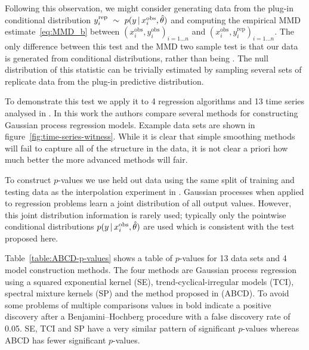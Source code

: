 \documentclass{article} %
\begin{document}
Following this observation, we might consider generating data from the plug-in conditional distribution ${y_i^\textrm{rep} \ \sim\  p(y\,|\, x_i^\textrm{obs}, \hat\theta)}$ and computing the empirical MMD estimate~\eqref{eq:MMD_b} between ${(x_i^\textrm{obs}, y_i^\textrm{obs})_{i=1\ldots n}}$ and ${(x_i^\textrm{obs}, y_i^\textrm{rep})_{i=1\ldots n}}$.
The only difference between this test and the MMD two sample test is that our data is generated from conditional distributions, rather than being \iid.
The null distribution of this statistic can be trivially estimated by sampling several sets of replicate data from the plug-in predictive distribution.

To demonstrate this test we apply it to 4 regression algorithms and 13 time series analysed in \cite{Lloyd2014-ABCD}.
In this work the authors compare several methods for constructing Gaussian process regression models.
Example data sets are shown in figure~\ref{fig:time-series-witness}.
While it is clear that simple smoothing methods will fail to capture all of the structure in the data, it is not clear a priori how much better the more advanced methods will fair.

To construct $p$-values we use held out data using the same split of training and testing data as the interpolation experiment in \cite{Lloyd2014-ABCD}.
Gaussian processes when applied to regression problems learn a joint distribution of all output values.
However, this joint distribution information is rarely used; typically only the pointwise conditional distributions ${p(y\,|\, x_i^\textrm{obs}, \hat\theta)}$ are used which is consistent with the test proposed here.

Table~\ref{table:ABCD-p-values} shows a table of $p$-values for 13 data sets and 4 model construction methods.
The four methods are Gaussian process regression using a squared exponential kernel (SE), trend-cyclical-irregular models \citep[e.g.][]{lind2006basic} (TCI), spectral mixture kernels \citep{WilAda13} (SP) and the method proposed in \cite{Lloyd2014-ABCD} (ABCD).
To avoid some problems of multiple comparisons values in  bold indicate a positive discovery after a Benjamini--Hochberg procedure with a false discovery rate of 0.05.
SE, TCI and SP have a very similar pattern of significant $p$-values whereas ABCD has fewer significant $p$-values.
\end{document}
